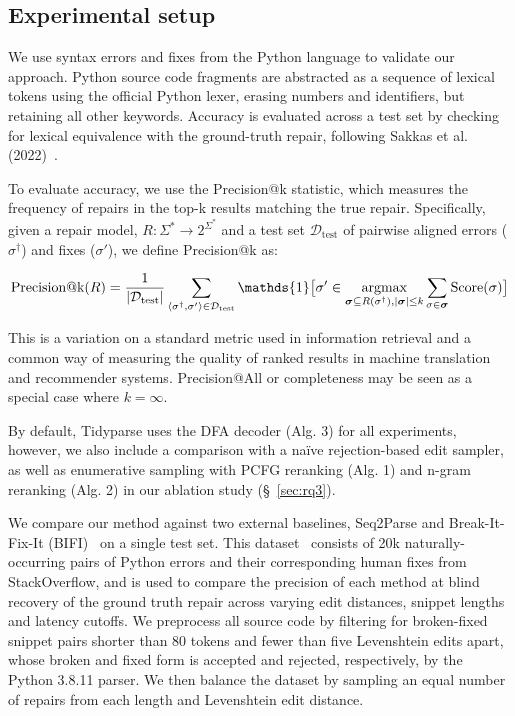 \documentclass[sigplan,acmsmall,nonacm,screen]{acmart}\settopmatter{printfolios=false,printccs=false,printacmref=false}
\begin{document}
  \subsection{Experimental setup}

  We use syntax errors and fixes from the Python language to validate our approach.  Python source code fragments are abstracted as a sequence of lexical tokens using the official Python lexer, erasing numbers and identifiers, but retaining all other keywords. Accuracy is evaluated across a test set by checking for lexical equivalence with the ground-truth repair, following Sakkas et al. (2022)~\cite{sakkas2022seq2parse}.

  To evaluate accuracy, we use the Precision@k statistic, which measures the frequency of repairs in the top-k results matching the true repair. Specifically, given a repair model, $R: \Sigma^* \rightarrow 2^{\Sigma^*}$ and a test set $\mathcal{D}_{\text{test}}$ of pairwise aligned errors ($\sigma^\dagger$) and fixes ($\sigma'$), we define Precision@k as:

\begin{equation}
\text{Precision@k}(R) = \frac{1}{|\mathcal{D}_{\text{test}}|}\sum_{\langle\sigma^\dagger, \sigma'\rangle \in \mathcal{D}_{\text{test}}} \mathds{1}\big[\sigma' \in \argmax_{\bm{\sigma} \subseteq R(\sigma^\dagger), |\bm{\sigma}| \leq k}\sum_{\sigma \in \bm{\sigma}}\text{Score}(\sigma)\big]
\end{equation}

  This is a variation on a standard metric used in information retrieval and a common way of measuring the quality of ranked results in machine translation and recommender systems. Precision@All or completeness may be seen as a special case where $k=\infty$.

  By default, Tidyparse uses the DFA decoder (Alg. 3) for all experiments, however, we also include a comparison with a na\"ive rejection-based edit sampler, as well as enumerative sampling with PCFG reranking (Alg. 1) and n-gram reranking (Alg. 2) in our ablation study (\S~\ref{sec:rq3}).

  We compare our method against two external baselines, Seq2Parse and Break-It-Fix-It (BIFI)~\cite{yasunaga2021break} on a single test set. This dataset~\cite{wong2019syntax} consists of 20k naturally-occurring pairs of Python errors and their corresponding human fixes from StackOverflow, and is used to compare the precision of each method at blind recovery of the ground truth repair across varying edit distances, snippet lengths and latency cutoffs. We preprocess all source code by filtering for broken-fixed snippet pairs shorter than 80 tokens and fewer than five Levenshtein edits apart, whose broken and fixed form is accepted and rejected, respectively, by the Python 3.8.11 parser. We then balance the dataset by sampling an equal number of repairs from each length and Levenshtein edit distance.
\end{document}
